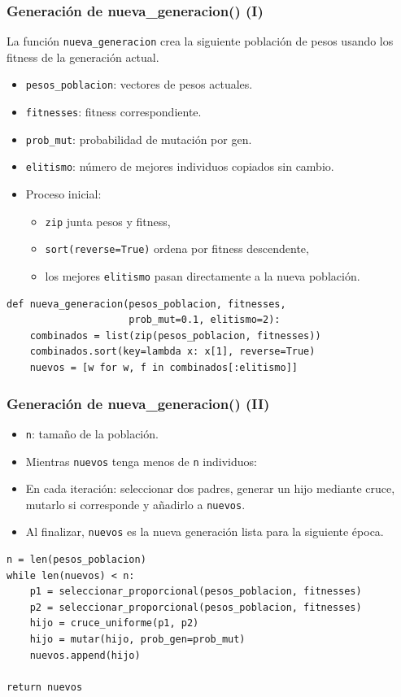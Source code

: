 \documentclass[
	11pt, %
]{beamer}
\begin{document}
\begin{frame}[fragile]
\frametitle{Generación de nueva\_generacion() (I)}

La función \texttt{nueva\_generacion} crea la siguiente población de pesos
usando los fitness de la generación actual.

\begin{itemize}
    \item \texttt{pesos\_poblacion}: vectores de pesos actuales.
    \item \texttt{fitnesses}: fitness correspondiente.
    \item \texttt{prob\_mut}: probabilidad de mutación por gen.
    \item \texttt{elitismo}: número de mejores individuos copiados sin cambio.
    \item Proceso inicial:
    \begin{itemize}
        \item \texttt{zip} junta pesos y fitness,
        \item \texttt{sort(reverse=True)} ordena por fitness descendente,
        \item los mejores \texttt{elitismo} pasan directamente a la nueva población.
    \end{itemize}
\end{itemize}

{\scriptsize
\begin{verbatim}
def nueva_generacion(pesos_poblacion, fitnesses,
                     prob_mut=0.1, elitismo=2):
    combinados = list(zip(pesos_poblacion, fitnesses))
    combinados.sort(key=lambda x: x[1], reverse=True)
    nuevos = [w for w, f in combinados[:elitismo]]
\end{verbatim}
}
\end{frame}



\begin{frame}[fragile]
\frametitle{Generación de nueva\_generacion() (II)}

\begin{itemize}
    \item \texttt{n}: tamaño de la población.
    \item Mientras \texttt{nuevos} tenga menos de \texttt{n} individuos:
    \item En cada iteración: seleccionar dos padres, generar un hijo mediante cruce,
mutarlo si corresponde y añadirlo a \texttt{nuevos}.

    \item Al finalizar, \texttt{nuevos} es la nueva generación lista para la siguiente época.
\end{itemize}

{\scriptsize
\begin{verbatim}
n = len(pesos_poblacion)
while len(nuevos) < n:
    p1 = seleccionar_proporcional(pesos_poblacion, fitnesses)
    p2 = seleccionar_proporcional(pesos_poblacion, fitnesses)
    hijo = cruce_uniforme(p1, p2)
    hijo = mutar(hijo, prob_gen=prob_mut)
    nuevos.append(hijo)

return nuevos
\end{verbatim}
}
\end{frame}
\end{document}
